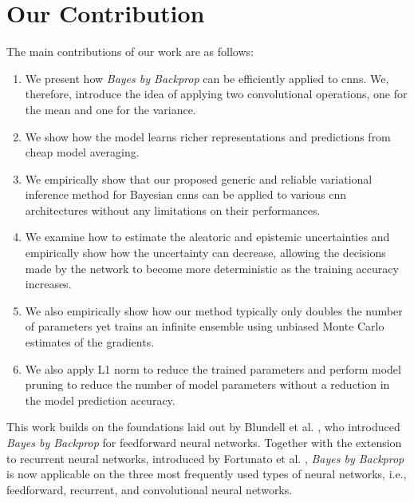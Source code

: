 \section{Our Contribution}
\newline The main contributions of our work are as follows: 
\begin{enumerate}
    \item We present how \textit{Bayes by Backprop} can be efficiently applied to \acp{cnn}. We, therefore, introduce the idea of applying two convolutional operations, one for the mean and one for the variance.
    \item We show how the model learns richer representations and predictions from cheap model averaging.
    \item We empirically show that our proposed generic and reliable variational inference method for Bayesian \acp{cnn} can be applied to various \ac{cnn} architectures without any limitations on their performances. 
    \item We examine how to estimate the aleatoric and epistemic uncertainties and empirically show how the uncertainty can decrease, allowing the decisions made by the network to become more deterministic as the training accuracy increases. 
    \item We also empirically show how our method typically only doubles the number of parameters yet trains an infinite ensemble using unbiased Monte Carlo estimates of the gradients. 
    \item We also apply L1 norm to reduce the trained parameters and perform model pruning to reduce the number of model parameters without a reduction in the model prediction accuracy. 
\end{enumerate} 
This work builds on the foundations laid out by Blundell et al. \cite{blundell2015weight}, who introduced \textit{Bayes by Backprop} for feedforward neural networks. Together with the extension to recurrent neural networks, introduced by Fortunato et al. \cite{fortunato2017bayesian}, \textit{Bayes by Backprop} is now applicable on the three most frequently used types of neural networks, i.e., feedforward, recurrent, and convolutional neural networks.


